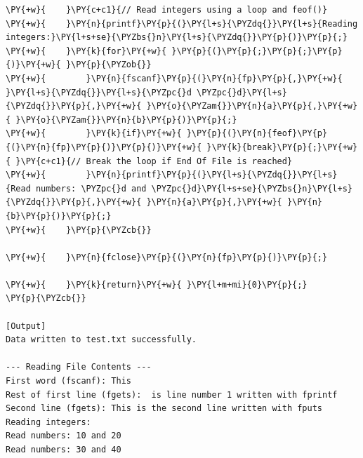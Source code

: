 \begin{Verbatim}[label=\makebox{\url{https://github.com/lucabaldini/cmepda/tree/master/slides/latex/snippets/file_io.c}},commandchars=\\\{\}]
\PY{+w}{    }\PY{c+c1}{// Read integers using a loop and feof()}
\PY{+w}{    }\PY{n}{printf}\PY{p}{(}\PY{l+s}{\PYZdq{}}\PY{l+s}{Reading integers:}\PY{l+s+se}{\PYZbs{}n}\PY{l+s}{\PYZdq{}}\PY{p}{)}\PY{p}{;}
\PY{+w}{    }\PY{k}{for}\PY{+w}{ }\PY{p}{(}\PY{p}{;}\PY{p}{;}\PY{p}{)}\PY{+w}{ }\PY{p}{\PYZob{}}
\PY{+w}{        }\PY{n}{fscanf}\PY{p}{(}\PY{n}{fp}\PY{p}{,}\PY{+w}{ }\PY{l+s}{\PYZdq{}}\PY{l+s}{\PYZpc{}d \PYZpc{}d}\PY{l+s}{\PYZdq{}}\PY{p}{,}\PY{+w}{ }\PY{o}{\PYZam{}}\PY{n}{a}\PY{p}{,}\PY{+w}{ }\PY{o}{\PYZam{}}\PY{n}{b}\PY{p}{)}\PY{p}{;}
\PY{+w}{        }\PY{k}{if}\PY{+w}{ }\PY{p}{(}\PY{n}{feof}\PY{p}{(}\PY{n}{fp}\PY{p}{)}\PY{p}{)}\PY{+w}{ }\PY{k}{break}\PY{p}{;}\PY{+w}{ }\PY{c+c1}{// Break the loop if End Of File is reached}
\PY{+w}{        }\PY{n}{printf}\PY{p}{(}\PY{l+s}{\PYZdq{}}\PY{l+s}{Read numbers: \PYZpc{}d and \PYZpc{}d}\PY{l+s+se}{\PYZbs{}n}\PY{l+s}{\PYZdq{}}\PY{p}{,}\PY{+w}{ }\PY{n}{a}\PY{p}{,}\PY{+w}{ }\PY{n}{b}\PY{p}{)}\PY{p}{;}
\PY{+w}{    }\PY{p}{\PYZcb{}}

\PY{+w}{    }\PY{n}{fclose}\PY{p}{(}\PY{n}{fp}\PY{p}{)}\PY{p}{;}

\PY{+w}{    }\PY{k}{return}\PY{+w}{ }\PY{l+m+mi}{0}\PY{p}{;}
\PY{p}{\PYZcb{}}

[Output]
Data written to test.txt successfully.

--- Reading File Contents ---
First word (fscanf): This
Rest of first line (fgets):  is line number 1 written with fprintf
Second line (fgets): This is the second line written with fputs
Reading integers:
Read numbers: 10 and 20
Read numbers: 30 and 40
\end{Verbatim}